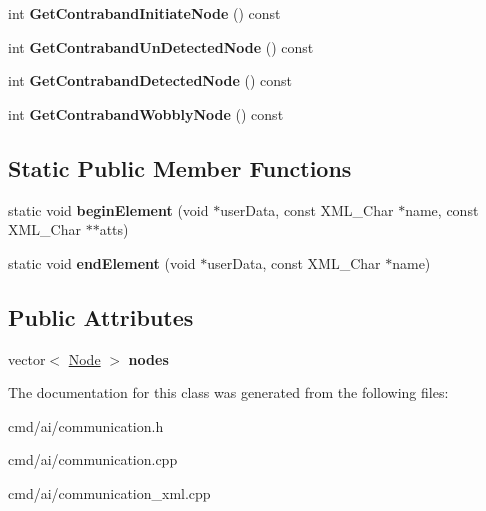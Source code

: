 \begin{DoxyCompactItemize}
\item 
int {\bfseries Get\+Contraband\+Initiate\+Node} () const \hypertarget{classFSM_a5c063c3c11b7ea9682b29ffce531cd12}{}\label{classFSM_a5c063c3c11b7ea9682b29ffce531cd12}

\item 
int {\bfseries Get\+Contraband\+Un\+Detected\+Node} () const \hypertarget{classFSM_a9147c9400d1be87613b8394c9ecd9fc2}{}\label{classFSM_a9147c9400d1be87613b8394c9ecd9fc2}

\item 
int {\bfseries Get\+Contraband\+Detected\+Node} () const \hypertarget{classFSM_ab1efa5cf561b7ca3bc0ce669a107da5e}{}\label{classFSM_ab1efa5cf561b7ca3bc0ce669a107da5e}

\item 
int {\bfseries Get\+Contraband\+Wobbly\+Node} () const \hypertarget{classFSM_a96f881cd947555baac3c734430b36e0f}{}\label{classFSM_a96f881cd947555baac3c734430b36e0f}

\end{DoxyCompactItemize}
\subsection*{Static Public Member Functions}
\begin{DoxyCompactItemize}
\item 
static void {\bfseries begin\+Element} (void $\ast$user\+Data, const X\+M\+L\+\_\+\+Char $\ast$name, const X\+M\+L\+\_\+\+Char $\ast$$\ast$atts)\hypertarget{classFSM_adc708200edf172ff393ba8adbbc681ac}{}\label{classFSM_adc708200edf172ff393ba8adbbc681ac}

\item 
static void {\bfseries end\+Element} (void $\ast$user\+Data, const X\+M\+L\+\_\+\+Char $\ast$name)\hypertarget{classFSM_aebc6f0a0cb99a8474c0d237f940f18f9}{}\label{classFSM_aebc6f0a0cb99a8474c0d237f940f18f9}

\end{DoxyCompactItemize}
\subsection*{Public Attributes}
\begin{DoxyCompactItemize}
\item 
vector$<$ \hyperlink{structFSM_1_1Node}{Node} $>$ {\bfseries nodes}\hypertarget{classFSM_aaa486eabf885207fc51ddce4675c44df}{}\label{classFSM_aaa486eabf885207fc51ddce4675c44df}

\end{DoxyCompactItemize}


The documentation for this class was generated from the following files\+:\begin{DoxyCompactItemize}
\item 
cmd/ai/communication.\+h\item 
cmd/ai/communication.\+cpp\item 
cmd/ai/communication\+\_\+xml.\+cpp\end{DoxyCompactItemize}
